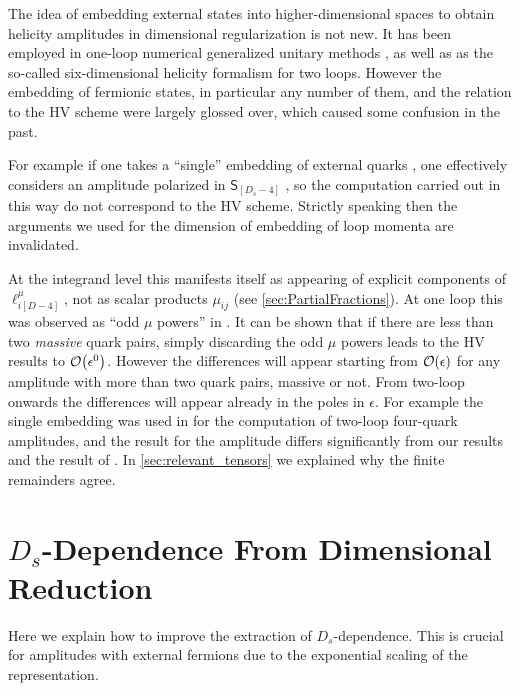 The idea of embedding external states into higher-dimensional spaces to obtain
helicity amplitudes in dimensional regularization is not new. 
It has been employed in one-loop numerical generalized
unitary methods \cite{Ellis:2007br,Giele:2008ve}, as well as as 
the so-called six-dimensional helicity formalism \cite{Bern2011,Cheung:2009dc,Badger:2013gxa,Badger:2017jhb} for two loops.
However the embedding of fermionic states, in particular any number of them,
and the relation to the HV scheme were largely glossed over,
which caused some confusion in the past.

For example if one takes a ``single'' embedding of external quarks  ,
one effectively considers an amplitude polarized in $\mathsf{S}_{[D_s-4]}$ ,
so the computation carried out in this way do not correspond to the HV scheme.
Strictly speaking then the arguments we used for the dimension of embedding of loop momenta are invalidated.

At the integrand level this manifests itself as appearing of explicit components of $\ell^\mu_{i[D-4]}$, not as scalar products $\mu_{ij}$ (see \cref{sec:PartialFractions}).
At one loop this was observed as ``odd $\mu$ powers'' in \cite{Fazio:2014xea,Badger:2017gta}.
It can be shown that if there are less than two \emph{massive} quark pairs, simply discarding 
the odd $\mu$ powers leads to the HV results to $\order{\eps^0}$.
However the differences will appear starting from $\order{\epsilon}$ for any amplitude
with more than two quark pairs, massive or not.
From two-loop onwards the differences will appear already in the poles in $\epsilon$. 
For example the single embedding was used in \cite{DeFreitas:2004kmi} for the computation of two-loop four-quark amplitudes,
and the result for the amplitude differs significantly from our results and the result of \cite{Glover:2004si}.
In \cref{sec:relevant_tensors} we explained why the finite remainders agree.


 

\section{$D_s$-Dependence From Dimensional Reduction}
\label{sec:ds_reduction}
Here we explain how to improve the extraction of $D_s$-dependence.
This is crucial for amplitudes with external fermions due to the exponential scaling of the representation.


